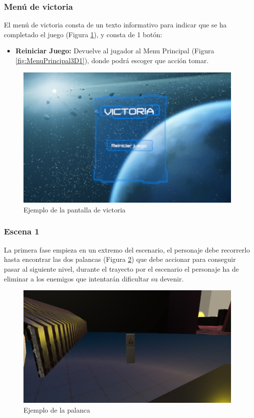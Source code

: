 \subsubsection{Menú de victoria}
El menú de victoria consta de un texto informativo para indicar que se ha completado el juego (Figura \ref{fig:MenuVictoria3D}), y consta de 1 botón:
\begin{itemize}
	\item \textbf{Reiniciar Juego:} Devuelve al jugador al Menu Principal (Figura \ref{fig:MenuPrincipal3D1}), donde podrá escoger que acción tomar.
\end{itemize}

\begin{figure}[H]
	\centering
	\includegraphics[scale=0.85]{imagenes/MenuVictoria3D.png}
	\caption{\label{fig:MenuVictoria3D}Ejemplo de la pantalla de victoria}
\end{figure}

\subsubsection{Escena 1}
La primera fase empieza en un extremo del escenario, el personaje debe recorrerlo hasta encontrar las dos palancas (Figura \ref{fig:Palanca}) que debe accionar para conseguir pasar al siguiente nivel, durante el trayecto por el escenario el personaje ha de eliminar a los enemigos que intentarán dificultar su devenir.

\begin{figure}[H]
	\centering
	\includegraphics[scale=0.75]{imagenes/Palanca.png}
	\caption{\label{fig:Palanca}Ejemplo de la palanca}
\end{figure}

